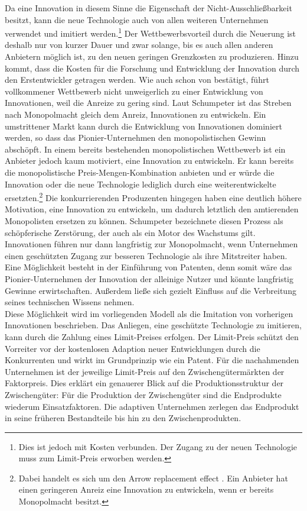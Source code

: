 Da eine Innovation in diesem Sinne die Eigenschaft der Nicht-Ausschlie{\ss}barkeit besitzt, kann die neue Technologie auch von allen weiteren Unternehmen verwendet und imitiert werden.\footnote{Dies ist jedoch mit Kosten verbunden. Der Zugang zu der neuen Technologie muss zum Limit-Preis erworben werden.} Der Wettbewerbsvorteil durch die Neuerung ist deshalb nur von kurzer Dauer und zwar solange, bis es auch allen anderen Anbietern möglich ist, zu den neuen geringen Grenzkosten zu produzieren. Hinzu kommt, dass die Kosten für die Forschung und Entwicklung der Innovation durch den Erstentwickler getragen werden. Wie auch schon von \citet{Schumpeter.1934} bestätigt, führt vollkommener Wettbewerb nicht unweigerlich zu einer Entwicklung von Innovationen, weil die Anreize zu gering sind. Laut Schumpeter ist das Streben nach Monopolmacht gleich dem Anreiz, Innovationen zu entwickeln. Ein umstrittener Markt kann durch die Entwicklung von Innovationen dominiert werden, so dass das Pionier-Unternehmen den monopolistischen Gewinn abschöpft.  In einem bereits bestehenden monopolistischen Wettbewerb ist ein Anbieter jedoch kaum motiviert, eine Innovation zu entwickeln. Er kann bereits die monopolistische Preis-Mengen-Kombination anbieten und er würde die Innovation oder die neue Technologie lediglich durch eine weiterentwickelte ersetzten.\footnote{Dabei handelt es sich um den Arrow replacement effect \citep{Arrow.1962}. Ein Anbieter hat einen geringeren Anreiz eine Innovation zu entwickeln, wenn er bereits Monopolmacht besitzt.} Die konkurrierenden Produzenten hingegen haben eine deutlich höhere Motivation, eine Innovation zu entwickeln, um dadurch letztlich den amtierenden Monopolisten ersetzen zu können. Schumpeter bezeichnete diesen Prozess als schöpferische Zerstörung, der auch als ein Motor des Wachstums gilt.\\


Innovationen führen nur dann langfristig zur Monopolmacht, wenn Unternehmen einen geschützten Zugang zur besseren Technologie als ihre Mitstreiter haben. Eine Möglichkeit besteht in der Einführung von Patenten, denn somit wäre das Pionier-Unternehmen der Innovation der alleinige Nutzer und könnte langfristig Gewinne erwirtschaften. Au{\ss}erdem lie{\ss}e sich gezielt Einfluss auf die Verbreitung seines technischen Wissens nehmen. \\


Diese Möglichkeit wird im vorliegenden Modell als die Imitation von vorherigen Innovationen beschrieben. Das Anliegen, eine geschützte Technologie zu imitieren, kann durch die Zahlung eines Limit-Preises erfolgen. Der Limit-Preis schützt den Vorreiter vor der kostenlosen Adaption neuer Entwicklungen durch die Konkurrenten und wirkt im Grundprinzip wie ein Patent.
Für die nachahmenden Unternehmen ist der jeweilige Limit-Preis auf den Zwischengütermärkten der Faktorpreis. Dies erklärt ein genauerer Blick auf die Produktionsstruktur der Zwischengüter: Für die Produktion der Zwischengüter sind die Endprodukte wiederum Einsatzfaktoren. Die adaptiven Unternehmen zerlegen das Endprodukt in seine früheren Bestandteile bis hin zu den Zwischenprodukten. \\


